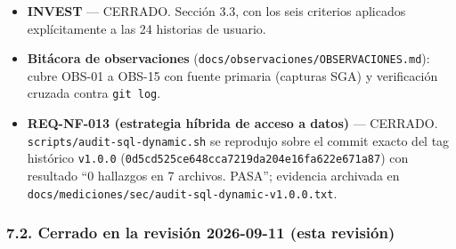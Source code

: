 \documentclass[
  spanish,
]{article}
\begin{document}
\begin{itemize}
\item
  \textbf{INVEST} --- CERRADO. Sección 3.3, con los seis criterios
  aplicados explícitamente a las 24 historias de usuario.
\item
  \textbf{Bitácora de observaciones}
  (\texttt{docs/\allowbreak{}observaciones/\allowbreak{}OBSERVACIONES.\allowbreak{}md}): cubre OBS-01 a OBS-15
  con fuente primaria (capturas SGA) y verificación cruzada contra
  \texttt{git\ log}.
\item
  \textbf{REQ-NF-013 (estrategia híbrida de acceso a datos)} ---
  CERRADO. \texttt{scripts/\allowbreak{}audit-\allowbreak{}sql-\allowbreak{}dynamic.\allowbreak{}sh} se reprodujo sobre el
  commit exacto del tag histórico \texttt{v1.\allowbreak{}0.\allowbreak{}0}
  (\texttt{0d5cd525ce648cca\allowbreak{}7219da204e16fa62\allowbreak{}2e671a87}) con resultado ``0
  hallazgos en 7 archivos. PASA''; evidencia archivada en
  \texttt{docs/\allowbreak{}mediciones/\allowbreak{}sec/\allowbreak{}audit-\allowbreak{}sql-\allowbreak{}dynamic-\allowbreak{}v1.\allowbreak{}0.\allowbreak{}0.\allowbreak{}txt}.
\end{itemize}

\subsubsection{7.2. Cerrado en la revisión 2026-09-11 (esta
revisión)}\label{cerrado-en-la-revisiuxf3n-2026-09-11-esta-revisiuxf3n}
\end{document}
